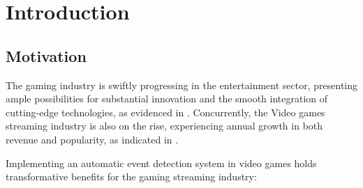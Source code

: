 
%

\chapter{Introduction}
\label{cha:introduction}


\epigraphfontsize{\small\itshape}
\setlength\epigraphwidth{12.5cm}
\setlength\epigraphrule{0pt}

\section{Motivation}
The gaming industry is swiftly progressing in the entertainment sector, presenting ample possibilities for substantial innovation and the smooth integration of cutting-edge technologies, as evidenced in \cite{VideogamesDataSurvey}. Concurrently, the Video games streaming industry is also on the rise, experiencing annual growth in both revenue and popularity, as indicated in \cite{TwitchRevenue2023} \cite{TwitchAudience} \cite{COVID-19Pandemic_on_Live-Stream_Broadcasters_Twitch}.

Implementing an automatic event detection system in video games holds transformative benefits for the gaming streaming industry:

